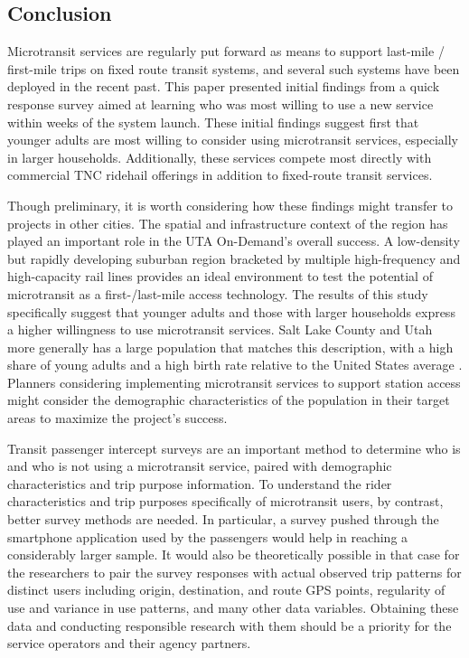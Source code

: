 \documentclass[smartcities,article,submit,moreauthors,pdftex]{mdpi}
\begin{document}
\hypertarget{conclusion}{%
\subsection{Conclusion}\label{conclusion}}

Microtransit services are regularly put forward as means to support last-mile /
first-mile trips on fixed route transit systems, and several such systems have
been deployed in the recent past. This paper presented initial findings from a
quick response survey aimed at learning who was most willing to use a new
service within weeks of the system launch. These initial findings suggest first
that younger adults are most willing to consider using microtransit services,
especially in larger households. Additionally, these services compete most
directly with commercial TNC ridehail offerings in addition to fixed-route
transit services.

Though preliminary, it is worth considering how these findings might transfer
to projects in other cities. The spatial and infrastructure context of the
region has played an important role in the UTA On-Demand's overall
success. A low-density but rapidly developing suburban region
bracketed by multiple high-frequency and high-capacity rail lines provides an
ideal environment to test the potential of microtransit as a first-/last-mile
access technology. The results of this study specifically suggest that younger
adults and those with larger households express a higher willingness to use
microtransit services. Salt Lake County and Utah more generally has a large
population that matches this description, with a high share of young adults and
a high birth rate relative to the United States average \citep{utahHealth}. Planners
considering implementing microtransit services to support station access might
consider the demographic characteristics of the population in their target areas
to maximize the project's success.

Transit passenger intercept surveys are an important method to determine who is
and who is not using a microtransit service, paired with demographic
characteristics and trip purpose information. To understand the rider
characteristics and trip purposes specifically of microtransit users, by
contrast, better survey methods are needed. In particular, a survey pushed
through the smartphone application used by the passengers would help in reaching
a considerably larger sample. It would also be theoretically possible in that
case for the researchers to pair the survey responses with actual observed trip
patterns for distinct users including origin, destination, and route GPS points,
regularity of use and variance in use patterns, and many other data variables.
Obtaining these data and conducting responsible research with them should be a
priority for the service operators and their agency partners.
\end{document}
